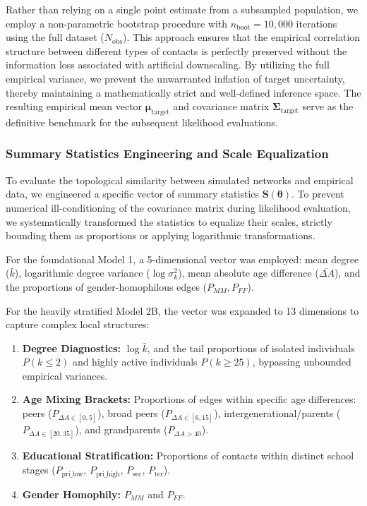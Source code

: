 Rather than relying on a single point estimate from a subsampled population,
we employ a non-parametric bootstrap procedure with $n_{\text{boot}} = 10,000$ iterations using the full dataset ($N_{\text{obs}}$).
This approach ensures that the empirical correlation structure between different types of contacts is perfectly preserved without the information loss associated with artificial downscaling.
By utilizing the full empirical variance, we prevent the unwarranted inflation of target uncertainty,
thereby maintaining a mathematically strict and well-defined inference space.
The resulting empirical mean vector $\boldsymbol{\mu}_{\text{target}}$ and covariance matrix $\boldsymbol{\Sigma}_{\text{target}}$ serve as the definitive benchmark for the subsequent likelihood evaluations.


\subsubsection{Summary Statistics Engineering and Scale Equalization}
To evaluate the topological similarity between simulated networks and empirical data, we engineered a specific vector of summary statistics $\mathbf{S}(\boldsymbol{\theta})$.
To prevent numerical ill-conditioning of the covariance matrix during likelihood evaluation, we systematically transformed the statistics to equalize their scales, strictly bounding them as proportions or applying logarithmic transformations.

For the foundational Model 1, a 5-dimensional vector was employed: mean degree ($\bar{k}$), logarithmic degree variance ($\log \sigma^2_k$), mean absolute age difference ($\overline{\Delta A}$), and the proportions of gender-homophilous edges ($P_{MM}, P_{FF}$).

For the heavily stratified Model 2B, the vector was expanded to 13 dimensions to capture complex local structures:
\begin{enumerate}
    \item \textbf{Degree Diagnostics:} $\log \bar{k}$, and the tail proportions of isolated individuals $P(k \le 2)$ and highly active individuals $P(k \ge 25)$, bypassing unbounded empirical variances.
    \item \textbf{Age Mixing Brackets:} Proportions of edges within specific age differences: peers ($P_{\Delta A \in [0, 5]}$), broad peers ($P_{\Delta A \in [6, 15]}$), intergenerational/parents ($P_{\Delta A \in [20, 35]}$), and grandparents ($P_{\Delta A > 40}$).
    \item \textbf{Educational Stratification:} Proportions of contacts within distinct school stages ($P_{\text{pri\_low}}$, $P_{\text{pri\_high}}$, $P_{\text{sec}}$, $P_{\text{ter}}$).
    \item \textbf{Gender Homophily:} $P_{MM}$ and $P_{FF}$.
\end{enumerate}

